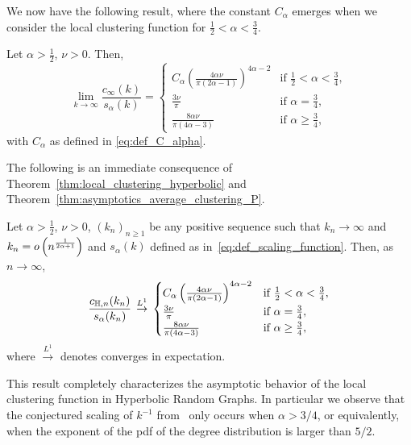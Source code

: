 We now have the following result, where the constant $C_\alpha$ emerges when we consider the local clustering function for $\frac{1}{2} < \alpha < \frac{3}{4}$.

\begin{theorem}\label{thm:asymptotics_average_clustering_P}
Let $\alpha > \frac{1}{2}$, $\nu > 0$. Then,
\[
	\lim_{k \to \infty} \frac{c_\infty(k)}{s_\alpha(k)} 
	= \begin{cases}
			C_\alpha \left(\frac{4\alpha \nu}{\pi\left(2\alpha - 1\right)}\right)^{4\alpha - 2}
			&\mbox{if } \frac{1}{2} < \alpha < \frac{3}{4},\\
			\frac{3 \nu}{\pi} &\mbox{if } \alpha = \frac{3}{4},\\
			\frac{8\alpha \nu}{\pi\left(4\alpha - 3\right)} &\mbox{if } \alpha \ge \frac{3}{4},
	\end{cases}
\]
with $C_\alpha$ as defined in \eqref{eq:def_C_alpha}.
\end{theorem}

The following is an immediate consequence of Theorem~\ref{thm:local_clustering_hyperbolic} and Theorem~\ref{thm:asymptotics_average_clustering_P}.

\begin{corollary}
Let $\alpha > \frac{1}{2}$, $\nu > 0$, $(k_n)_{n \ge 1}$ be any positive sequence such that $k_n \to \infty$ and $k_n = o\left(n^{\frac{1}{2\alpha + 1}}\right)$ and $s_\alpha(k)$ defined as in~\eqref{eq:def_scaling_function}. Then, as $n \to \infty$,
\[
	\frac{c_{\mathbb{H},n}(k_n)}{s_\alpha(k_n)} \, \stackrel{L^1}{\rightarrow} \, 
	\begin{cases}
				C_\alpha \left(\frac{4\alpha \nu}{\pi\left(2\alpha - 1\right)}\right)^{4\alpha - 2}
				&\mbox{if } \frac{1}{2} < \alpha < \frac{3}{4},\\
				\frac{3\nu}{\pi} &\mbox{if } \alpha = \frac{3}{4},\\
				\frac{8\alpha \nu}{\pi\left(4\alpha - 3\right)} &\mbox{if } \alpha \ge \frac{3}{4},
		\end{cases}
\]
where $\stackrel{L^1}{\to}$ denotes converges in expectation.
\end{corollary}

This result completely characterizes the asymptotic behavior of the local clustering function in Hyperbolic Random Graphs. In particular we observe that the conjectured scaling of $k^{-1}$ from~\cite{krioukov2010hyperbolic} only occurs when $\alpha > 3/4$, or equivalently, when the exponent of the pdf of the degree distribution is larger than $5/2$. 

